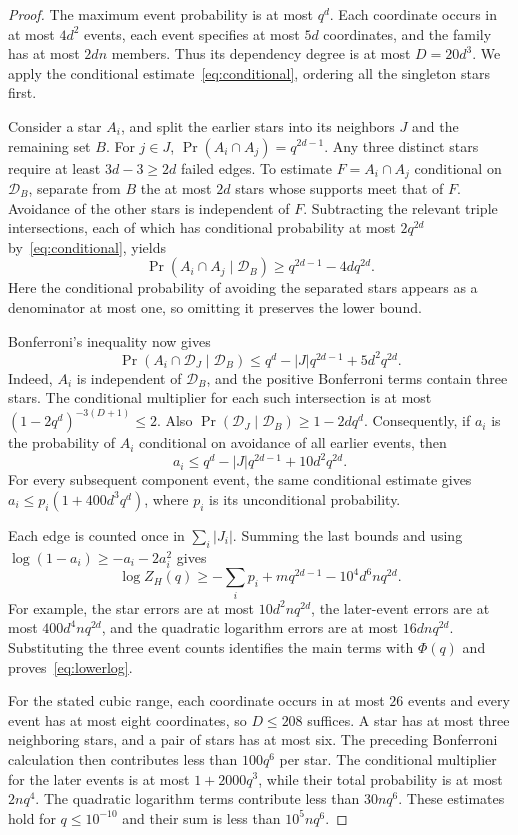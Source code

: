 \documentclass[11pt,reqno]{amsart}
\theoremstyle{remark}
\numberwithin{equation}{section}
\newcommand{\avo}{\mathcal D}
\begin{document}
\begin{proof}
The maximum event probability is at most $q^d$.  Each coordinate
occurs in at most $4d^2$ events, each event specifies at most $5d$
coordinates, and the family has at most $2dn$ members.  Thus its
dependency degree is at most $D=20d^3$.  We apply the conditional
estimate~\eqref{eq:conditional}, ordering all the singleton stars
first.

Consider a star $A_i$, and split the earlier stars into its
neighbors $J$ and the remaining set $B$.  For $j\in J$,
$\Pr(A_i\cap A_j)=q^{2d-1}$.  Any three distinct stars require at
least $3d-3\ge2d$ failed edges.  To estimate
$F=A_i\cap A_j$ conditional on $\avo_B$, separate from $B$ the
at most $2d$ stars whose supports meet that of $F$.  Avoidance of
the other stars is independent of $F$.  Subtracting the relevant
triple intersections, each of which has conditional probability at
most $2q^{2d}$ by~\eqref{eq:conditional}, yields
\[
 \Pr(A_i\cap A_j\mid\avo_B)
 \ge q^{2d-1}-4dq^{2d}.
\]
Here the conditional probability of avoiding the separated stars
appears as a denominator at most one, so omitting it preserves the
lower bound.

Bonferroni's inequality now gives
\[
 \Pr(A_i\cap\avo_J\mid\avo_B)
 \le q^d-|J|q^{2d-1}+5d^2q^{2d}.
\]
Indeed, $A_i$ is independent of $\avo_B$, and the positive
Bonferroni terms contain three stars.  The conditional multiplier
for each such intersection is at most
$(1-2q^d)^{-3(D+1)}\le2$.  Also
$\Pr(\avo_J\mid\avo_B)\ge1-2dq^d$.  Consequently, if $a_i$
is the probability of $A_i$ conditional on avoidance of all
earlier events, then
\[
 a_i\le q^d-|J|q^{2d-1}+10d^2q^{2d}.
\]
For every subsequent component event, the same conditional estimate
gives $a_i\le p_i(1+400d^3q^d)$, where $p_i$ is its
unconditional probability.

Each edge is counted once in $\sum_i|J_i|$.  Summing the last
bounds and using $\log(1-a_i)\ge-a_i-2a_i^2$ gives
\[
 \log Z_H(q)
 \ge-\sum_i p_i+mq^{2d-1}-10^4d^6nq^{2d}.
\]
For example, the star errors are at most $10d^2nq^{2d}$,
the later-event errors are at most $400d^4nq^{2d}$, and the
quadratic logarithm errors are at most $16dnq^{2d}$.  Substituting
the three event counts identifies the main terms with $\Phi(q)$
and proves~\eqref{eq:lowerlog}.

For the stated cubic range, each coordinate occurs in at most
$26$ events and every event has at most eight coordinates, so
$D\le208$ suffices.  A star has at most three neighboring stars,
and a pair of stars has at most six.  The preceding Bonferroni
calculation then contributes less than $100q^6$ per star.  The
conditional multiplier for the later events is at most
$1+2000q^3$, while their total probability is at most $2nq^4$.
The quadratic logarithm terms contribute less than $30nq^6$.
These estimates hold for $q\le10^{-10}$ and their sum is less
than $10^5nq^6$.
\end{proof}
\end{document}
